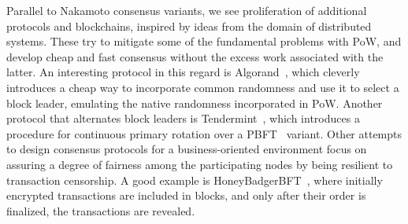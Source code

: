 Parallel to Nakamoto consensus variants, we see proliferation of additional protocols and blockchains, inspired by ideas from the domain of distributed systems. These try to mitigate some of the fundamental problems with PoW, and develop cheap and fast consensus without the excess work associated with the latter. 
An interesting protocol in this regard is Algorand~\cite{AlgorandV9}, which cleverly introduces a cheap way to incorporate common randomness and use it to select a block leader, emulating the native randomness incorporated in PoW. Another protocol that alternates block leaders is Tendermint~\cite{Tendermint}, which introduces a procedure for continuous primary rotation over a PBFT~\cite{PBFT} variant. Other attempts to design consensus protocols for a business-oriented environment focus on assuring a degree of fairness among the participating nodes by being resilient to transaction censorship. A good example is HoneyBadgerBFT~\cite{HoneyBadger}, where initially encrypted transactions are included in blocks, and only after their order is finalized, the transactions are revealed.


